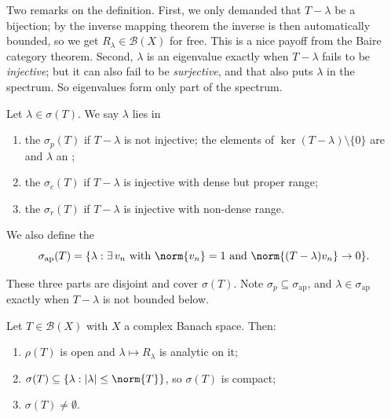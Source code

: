 \documentclass[a4paper]{scrartcl}
\newcommand{\Bop}{\mathcal{B}}
\begin{document}
Two remarks on the definition. First, we only demanded that $T - \lambda$ be a bijection; by the inverse mapping theorem the inverse is then automatically bounded, so we get $R_\lambda \in \Bop(X)$ for free. This is a nice payoff from the Baire category theorem. Second, $\lambda$ is an eigenvalue exactly when $T - \lambda$ fails to be \emph{injective}; but it can also fail to be \emph{surjective}, and that also puts $\lambda$ in the spectrum. So eigenvalues form only part of the spectrum.

\begin{definition}
	Let $\lambda\in\sigma(T)$. We say $\lambda$ lies in
	\begin{enumerate}[label=(\roman*)]
		\item the  $\sigma_p(T)$ if $T-\lambda$ is not injective; the elements of $\ker(T-\lambda)\setminus\{0\}$ are  and $\lambda$ an ;
		\item the  $\sigma_c(T)$ if $T-\lambda$ is injective with dense but proper range;
		\item the  $\sigma_r(T)$ if $T-\lambda$ is injective with non-dense range.
	\end{enumerate}
	We also define the 
	$$\sigma_{\mathrm{ap}}(T) = \{ \lambda : \exists\, v_n \text{ with } \norm{v_n}=1 \text{ and } \norm{(T-\lambda)v_n}\to0 \}.$$
\end{definition}

These three parts are disjoint and cover $\sigma(T)$. Note $\sigma_p \subseteq \sigma_{\mathrm{ap}}$, and $\lambda \in \sigma_{\mathrm{ap}}$ exactly when $T - \lambda$ is not bounded below.

\begin{theorem}
	Let $T \in \Bop(X)$ with $X$ a complex Banach space. Then:
	\begin{enumerate}[label=(\roman*)]
		\item $\rho(T)$ is open and $\lambda\mapsto R_\lambda$ is analytic on it;
		\item $\sigma(T)\subseteq\{\lambda : |\lambda|\leq\norm{T}\}$, so $\sigma(T)$ is compact;
		\item $\sigma(T)\neq\emptyset$.
	\end{enumerate}
\end{theorem}
\end{document}
